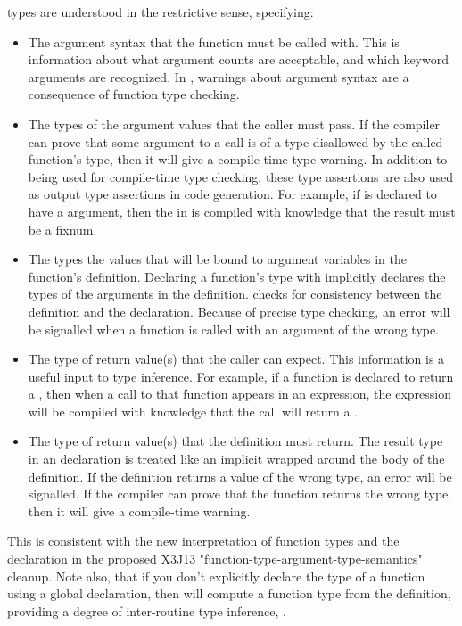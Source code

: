  types are understood in the restrictive sense, specifying:
\begin{itemize}

\item
The argument syntax that the function must be called with.  This is
information about what argument counts are acceptable, and which
keyword arguments are recognized.  In \python, warnings about
argument syntax are a consequence of function type checking.

\item
The types of the argument values that the caller must pass.  If the compiler
can prove that some argument to a call is of a type disallowed by the called
function's type, then it will give a compile-time type warning.  In addition to
being used for compile-time type checking, these type assertions are also used
as output type assertions in code generation.  For example, if  is
declared to have a  argument, then the  in 
is compiled with knowledge that the result must be a fixnum.

\item
The types the values that will be bound to argument variables in the function's
definition.  Declaring a function's type with  implicitly declares the
types of the arguments in the definition.  \python{} checks for consistency
between the definition and the  declaration.  Because of precise type
checking, an error will be signalled when a function is called with an argument
of the wrong type.

\item
The type of return value(s) that the caller can expect.  This information is a
useful input to type inference.  For example, if a function is declared to
return a , then when a call to that function appears in an
expression, the expression will be compiled with knowledge that the call will
return a .

\item
The type of return value(s) that the definition must return.  The result type
in an  declaration is treated like an implicit  wrapped around
the body of the definition.  If the definition returns a value of the wrong
type, an error will be signalled.  If the compiler can prove that the function
returns the wrong type, then it will give a compile-time warning.
\end{itemize}

This is consistent with the new interpretation of function types and the
 declaration in the proposed X3J13
"function-type-argument-type-semantics" cleanup.  Note also, that if you don't
explicitly declare the type of a function using a global  declaration,
then \python{} will compute a function type from the definition, providing a
degree of inter-routine type inference, .

